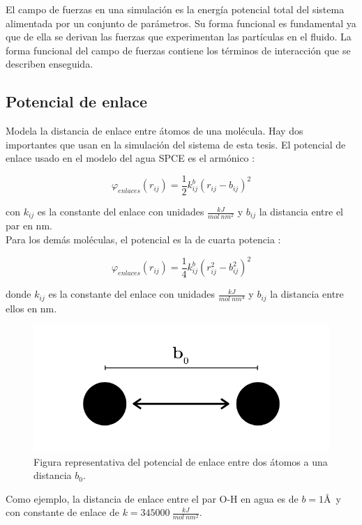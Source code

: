 El campo de fuerzas en una simulación es la energía potencial total del sistema alimentada por un conjunto de parámetros. Su forma funcional es fundamental ya que de ella se derivan las fuerzas que experimentan las partículas en el fluido. La forma funcional del campo de fuerzas contiene los términos de interacción que se describen enseguida.\\

\subsection{Potencial de enlace}

Modela la distancia de enlace entre átomos de una molécula. Hay dos importantes que usan en la simulación del sistema de esta tesis. El potencial de enlace usado en el modelo del agua SPCE es el armónico \cite{gromacsdoc}:

\begin{equation}
    \varphi_{enlaces}(r_{ij}) = \frac{1}{2}k_{ij}^{b}(r_{ij} - b_{ij})^2
\end{equation}

\noindent con $k_{ij}$ es la constante del enlace con unidades $\frac{kJ}{mol\ nm^2}$ y $b_{ij}$ la distancia entre el par en nm.\\

Para los demás moléculas, el potencial es la de cuarta potencia \cite{gromacsdoc}:

\begin{equation}
    \varphi_{enlaces}(r_{ij}) = \frac{1}{4}k_{ij}^{b}(r_{ij}^2 - b^{2}_{ij})^2
\end{equation}

\noindent donde $k_{ij}$ es la constante del enlace con unidades $\frac{kJ}{mol\ nm^4}$ y $b_{ij}$ la distancia entre ellos en nm.\\

\begin{figure}[!h]
    \centering
    \includegraphics[width=.4\linewidth]{MD/bondpotential.png}  
    \caption{Figura representativa del potencial de enlace entre dos átomos a una distancia $b_0$.}
    \label{fig:bondpotential}
\end{figure}

Como ejemplo, la distancia de enlace entre el par O-H en agua es de $b=1$\AA\ y con constante de enlace de $k=345000\ \frac{kJ}{mol\ nm^2}$.


